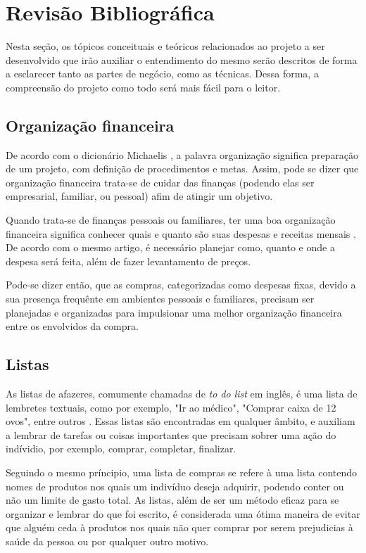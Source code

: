\chapter{Revisão Bibliográfica}
Nesta seção, os tópicos conceituais e teóricos relacionados ao projeto a ser desenvolvido que irão auxiliar o entendimento do mesmo serão descritos de forma a esclarecer tanto as partes de negócio, como as técnicas. Dessa forma, a compreensão do projeto como todo será mais fácil para o leitor.

\section{Organização financeira}
De acordo com o dicionário Michaelis \cite{Michaelis}, a palavra organização significa preparação de um projeto, com definição de procedimentos e metas. Assim, pode se dizer que organização financeira trata-se de cuidar das finanças (podendo elas ser empresarial, familiar, ou pessoal) afim de atingir um objetivo.

Quando trata-se de finanças pessoais ou familiares, ter uma boa organização financeira significa conhecer quais e quanto são suas despesas e receitas mensais \cite{PlanejamentoFinanceiroFamiliar}. De acordo com o mesmo artigo, é necessário planejar como, quanto e onde a despesa será feita, além de fazer levantamento de preços.

Pode-se dizer então, que as compras, categorizadas como despesas fixas, devido a sua presença frequênte em ambientes pessoais e familiares, precisam ser planejadas e organizadas para impulsionar uma melhor organização financeira entre os envolvidos da compra.

\section{Listas}
As listas de afazeres, comumente chamadas de \textit{to do list} em inglês, é uma lista de lembretes textuais, como por exemplo, "Ir ao médico", "Comprar caixa de 12 ovos", entre outros \cite{Towel}. Essas listas são encontradas em qualquer âmbito, e auxiliam a lembrar de tarefas ou coisas importantes que precisam sobrer uma ação do indívidio, por exemplo, comprar, completar, finalizar.

Seguindo o mesmo príncipio, uma lista de compras se refere à uma lista contendo nomes de produtos nos quais um indivíduo deseja adquirir, podendo conter ou não um limite de gasto total. As listas, além de ser um método eficaz para se organizar e lembrar do que foi escrito, é considerada uma ótima maneira de evitar que alguém ceda à produtos nos quais não quer comprar por serem prejudicias à saúde da pessoa \cite{GroceryList} ou por qualquer outro motivo.

